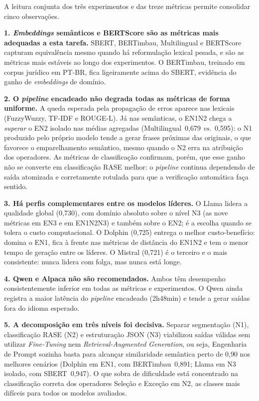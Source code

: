 \documentclass[a4paper,fleqn]{cas-sc}
\begin{document}
A leitura conjunta dos três experimentos e das treze métricas permite consolidar cinco observações.

\textbf{1. \textit{Embeddings} semânticos e BERTScore são as métricas mais adequadas a esta tarefa.} SBERT, BERTimbau, Multilingual e BERTScore capturam equivalência mesmo quando há reformulação lexical pesada, e são as métricas mais estáveis ao longo dos experimentos. O BERTimbau, treinado em corpus jurídico em PT-BR, fica ligeiramente acima do SBERT, evidência do ganho de \textit{embeddings} de domínio.

\textbf{2. O \textit{pipeline} encadeado não degrada todas as métricas de forma uniforme.} A queda esperada pela propagação de erros aparece nas lexicais (FuzzyWuzzy, TF-IDF e ROUGE-L). Já nas semânticas, o EN1N2 chega a \textit{superar} o EN2 isolado nas médias agregadas (Multilingual~0{,}679 \textit{vs.}~0{,}595): o N1 produzido pelo próprio modelo tende a gerar frases próximas das originais, o que favorece o emparelhamento semântico, mesmo quando o N2 erra na atribuição dos operadores. As métricas de classificação confirmam, porém, que esse ganho não se converte em classificação RASE melhor: o \textit{pipeline} continua dependendo de saída atomizada e corretamente rotulada para que a verificação automática faça sentido.

\textbf{3. Há perfis complementares entre os modelos líderes.} O Llama lidera a qualidade global (0{,}730), com domínio absoluto sobre o nível N3 (as nove métricas em EN3 e em EN1N2N3) e também sobre o EN2; é a escolha quando se tolera o custo computacional. O Dolphin (0{,}725) entrega o melhor custo-benefício: domina o EN1, fica à frente nas métricas de distância do EN1N2 e tem o menor tempo de geração entre os líderes. O Mistral (0{,}721) é o terceiro e o mais consistente: nunca lidera com folga, mas nunca está longe.

\textbf{4. Qwen e Alpaca não são recomendados.} Ambos têm desempenho consistentemente inferior em todas as métricas e experimentos. O Qwen ainda registra a maior latência do \textit{pipeline} encadeado (2h48min) e tende a gerar saídas fora do idioma esperado.

\textbf{5. A decomposição em três níveis foi decisiva.} Separar segmentação (N1), classificação RASE (N2) e estruturação JSON (N3) viabilizou saídas válidas sem utilizar \textit{Fine-Tuning} nem \textit{Retrieval-Augmented Generation}, ou seja, Engenharia de Prompt sozinha basta para alcançar similaridade semântica perto de 0{,}90 nos melhores cenários (Dolphin em EN1, com BERTimbau~0{,}891; Llama em N3 isolado, com SBERT~0{,}947). O que sobra de dificuldade está concentrado na classificação correta dos operadores Seleção e Exceção em N2, as classes mais difíceis para todos os modelos avaliados.
\end{document}
